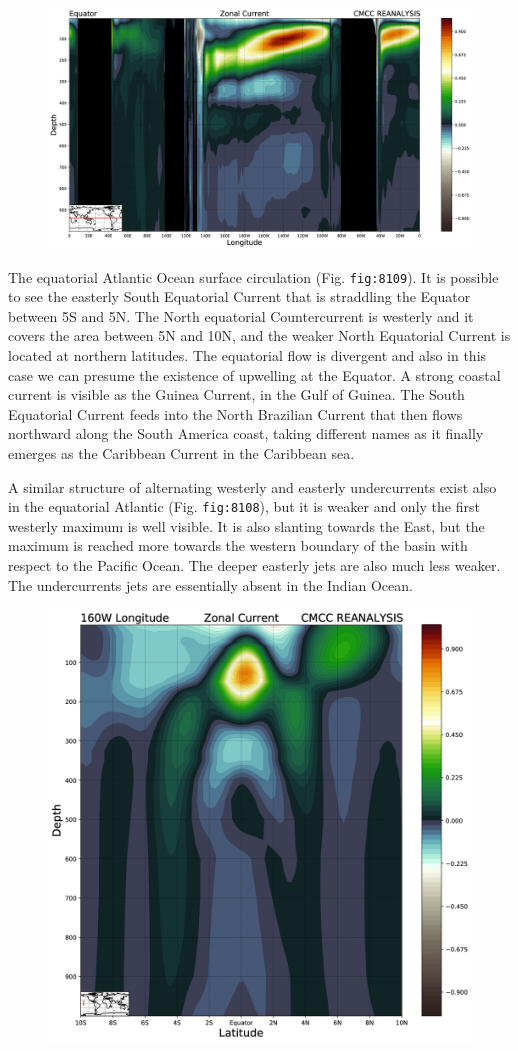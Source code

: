 \begin{figure}
\centering
\includegraphics[width = .7 \textwidth]{figs/GD/SectZonal_CurrentEquator1000.png}
\caption{} \label{fig:}
\end{figure}

The equatorial Atlantic Ocean surface circulation (Fig.
\texttt{fig:8109}). It is possible to see the easterly South Equatorial
Current that is straddling the Equator between 5S and 5N. The North
equatorial Countercurrent is westerly and it covers the area between 5N
and 10N, and the weaker North Equatorial Current is located at northern
latitudes. The equatorial flow is divergent and also in this case we can
presume the existence of upwelling at the Equator. A strong coastal
current is visible as the Guinea Current, in the Gulf of Guinea. The
South Equatorial Current feeds into the North Brazilian Current that
then flows northward along the South America coast, taking different
names as it finally emerges as the Caribbean Current in the Caribbean
sea.

A similar structure of alternating westerly and easterly undercurrents
exist also in the equatorial Atlantic (Fig. \texttt{fig:8108}), but it
is weaker and only the first westerly maximum is well visible. It is
also slanting towards the East, but the maximum is reached more towards
the western boundary of the basin with respect to the Pacific Ocean. The
deeper easterly jets are also much less weaker. The undercurrents jets
are essentially absent in the Indian Ocean.

\begin{figure}
\centering
\includegraphics[width = .7 \textwidth]{figs/GD/SectZonal_Current160W1000.png}
\caption{} \label{fig:}
\end{figure}

